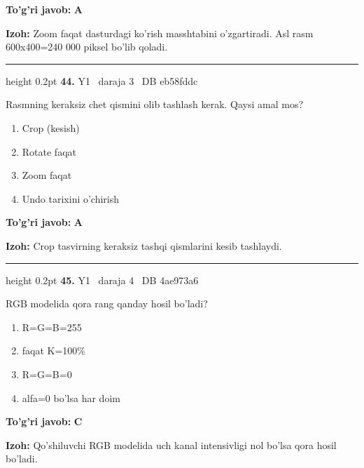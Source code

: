 \documentclass[10pt,a4paper,oneside]{article}
\begin{document}
\begin{tcolorbox}[enhanced,breakable,colback=teal!4,colframe=teal!45!black,boxrule=0.45pt,arc=1.2mm,left=2.8mm,right=2.8mm,top=2mm,bottom=2mm,before skip=2mm,after skip=2mm]
\textbf{\color{teal}To'g'ri javob:} \textbf{A}
\par\smallskip
\textbf{Izoh:} Zoom faqat dasturdagi ko'rish masshtabini o'zgartiradi. Asl rasm 600x400=240 000 piksel bo'lib qoladi.
\end{tcolorbox}
\vspace{2mm}\hrule height 0.2pt \vspace{4mm}
\hypertarget{q44}{\textbf{\color{ink}44.}}  {\color{muted}\scriptsize Y1 \textbullet\ daraja 3 \textbullet\ DB eb58fddc}
\par
Rasmning keraksiz chet qismini olib tashlash kerak. Qaysi amal mos?
\begin{enumerate}[label=\Alph*),leftmargin=9mm]
\item Crop (kesish)
\item Rotate faqat
\item Zoom faqat
\item Undo tarixini o'chirish
\end{enumerate}
\begin{tcolorbox}[enhanced,breakable,colback=teal!4,colframe=teal!45!black,boxrule=0.45pt,arc=1.2mm,left=2.8mm,right=2.8mm,top=2mm,bottom=2mm,before skip=2mm,after skip=2mm]
\textbf{\color{teal}To'g'ri javob:} \textbf{A}
\par\smallskip
\textbf{Izoh:} Crop tasvirning keraksiz tashqi qismlarini kesib tashlaydi.
\end{tcolorbox}
\vspace{2mm}\hrule height 0.2pt \vspace{4mm}
\hypertarget{q45}{\textbf{\color{ink}45.}}  {\color{muted}\scriptsize Y1 \textbullet\ daraja 4 \textbullet\ DB 4ae973a6}
\par
RGB modelida qora rang qanday hosil bo'ladi?
\begin{enumerate}[label=\Alph*),leftmargin=9mm]
\item R=G=B=255
\item faqat K=100\%
\item R=G=B=0
\item alfa=0 bo'lsa har doim
\end{enumerate}
\begin{tcolorbox}[enhanced,breakable,colback=teal!4,colframe=teal!45!black,boxrule=0.45pt,arc=1.2mm,left=2.8mm,right=2.8mm,top=2mm,bottom=2mm,before skip=2mm,after skip=2mm]
\textbf{\color{teal}To'g'ri javob:} \textbf{C}
\par\smallskip
\textbf{Izoh:} Qo'shiluvchi RGB modelida uch kanal intensivligi nol bo'lsa qora hosil bo'ladi.
\end{tcolorbox}
\end{document}
